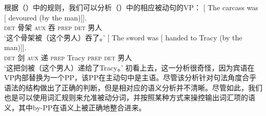 根据（）中的规则，我们可以分析（）中的相应被动句的VP：
\eal
\ex
\gll {} [ The carcass was [ devoured (by the man)]].\\
{} {} \textsc{det} 骨架 \textsc{aux} {} 吞 \textsc{prep} \textsc{det} 男人\\
\glt `这个骨架被（这个男人）吞了。'
\ex
\gll {} [ The sword was [ handed to Tracy (by the man)]].\\
{} {} \textsc{det} 剑 \textsc{aux} {} 递 \textsc{prep} Tracy \textsc{prep} \textsc{det} 男人\\
\glt `这把剑被（这个男人）递给了Tracy。'
\zl
%
初看上去，这一分析很奇怪，因为宾语在VP内部替换为一个PP，该PP在主动句中是主语。尽管该分析针对句法角度合乎语法的结构做出了正确的判断，但是相对应的语义分析并不清晰。尽管如此，我们也是可以使用词汇规则来允准被动分词，并按照某种方式来操控输出词汇项的语义，其中by-PP在语义上被正确地整合进来\citep[]{GKPS85a}。

